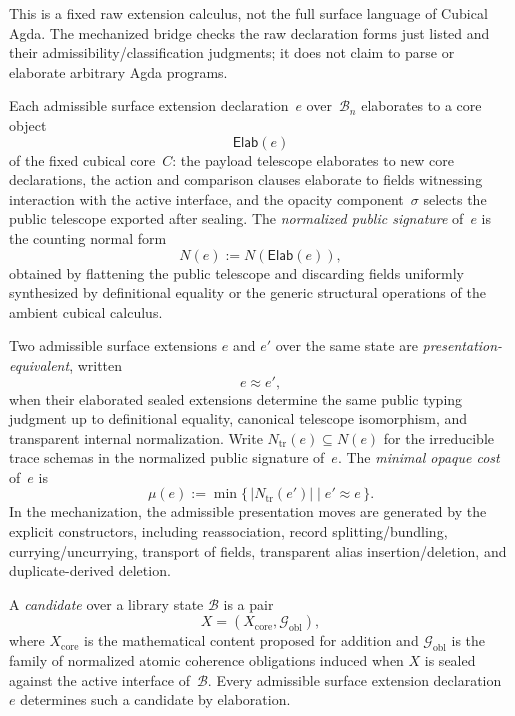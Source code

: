 \documentclass{lmcs}
\newcommand{\B}{\mathcal{B}}
\newcommand{\Gcal}{\mathcal{G}}
\begin{document}
This is a fixed raw extension calculus, not the full surface language of Cubical Agda. The mechanized bridge checks the raw declaration forms just listed and their admissibility/classification judgments; it does not claim to parse or elaborate arbitrary Agda programs.

\begin{defi}
\label{def:elaboration}
Each admissible surface extension declaration~$e$ over~$\B_n$ elaborates to a core object
\[
  \mathsf{Elab}(e)
\]
of the fixed cubical core~$C$: the payload telescope elaborates to new core declarations, the action and comparison clauses elaborate to fields witnessing interaction with the active interface, and the opacity component~$\sigma$ selects the public telescope exported after sealing. The \emph{normalized public signature} of~$e$ is the counting normal form
\[
  N(e) := N(\mathsf{Elab}(e)),
\]
obtained by flattening the public telescope and discarding fields uniformly synthesized by definitional equality or the generic structural operations of the ambient cubical calculus.
\end{defi}

\begin{defi}
\label{def:mu}
Two admissible surface extensions $e$ and $e'$ over the same state are \emph{presentation-equivalent}, written
\[
  e \approx e',
\]
when their elaborated sealed extensions determine the same public typing judgment up to definitional equality, canonical telescope isomorphism, and transparent internal normalization. Write $N_{\mathrm{tr}}(e) \subseteq N(e)$ for the irreducible trace schemas in the normalized public signature of~$e$. The \emph{minimal opaque cost} of~$e$ is
\[
  \mu(e) := \min \bigl\{\, |N_{\mathrm{tr}}(e')| \;\big|\; e' \approx e \,\bigr\}.
\]
In the mechanization, the admissible presentation moves are generated by the explicit  constructors, including reassociation, record splitting/bundling, currying/uncurrying, transport of fields, transparent alias insertion/deletion, and duplicate-derived deletion.
\end{defi}

\begin{defi}[Candidate]
\label{def:candidate}
A \emph{candidate} over a library state $\B$ is a pair
\[
  X = (X_{\mathrm{core}}, \Gcal_{\mathrm{obl}}),
\]
where $X_{\mathrm{core}}$ is the mathematical content proposed for addition and $\Gcal_{\mathrm{obl}}$ is the family of normalized atomic coherence obligations induced when $X$ is sealed against the active interface of~$\B$.
Every admissible surface extension declaration~$e$ determines such a candidate by elaboration.
\end{defi}
\end{document}
